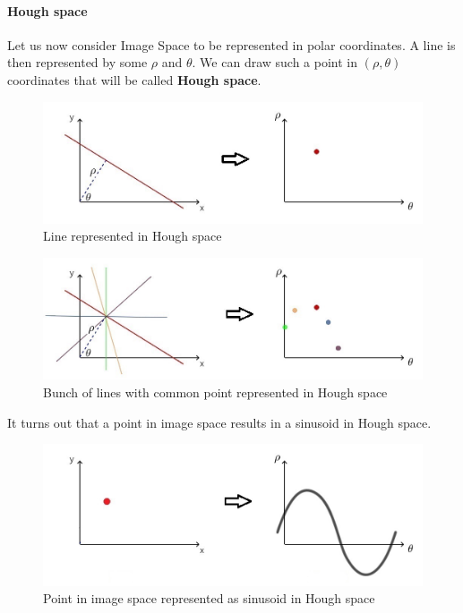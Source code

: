\paragraph{Hough space}
Let us now consider Image Space to be represented in polar coordinates. A line is then represented by some $\rho$ and $\theta$. We can draw such a point in $(\rho, \theta)$ coordinates that will be called \textbf{Hough space}.\cite{hough-lines}
\begin{figure}[H]
	\centering
	\includegraphics[width=\textwidth]{images/line_to_hough_space}
	\caption{Line represented in Hough space}
	\label{fig:line_hough_space}
\end{figure}
\begin{figure}[H]
	\centering
	\includegraphics[width=\textwidth]{images/lines_to_hough_space}
	\caption{Bunch of lines with common point represented in Hough space}
	\label{fig:bunch_of_lines_hough_space}
\end{figure}
It turns out that a point in image space results in a sinusoid in Hough space.
\begin{figure}[H]
	\centering
	\includegraphics[width=\textwidth]{images/point_to_sinusoid}
	\caption{Point in image space represented as sinusoid in Hough space}
	\label{fig:point_to_sinusoid}
\end{figure}
